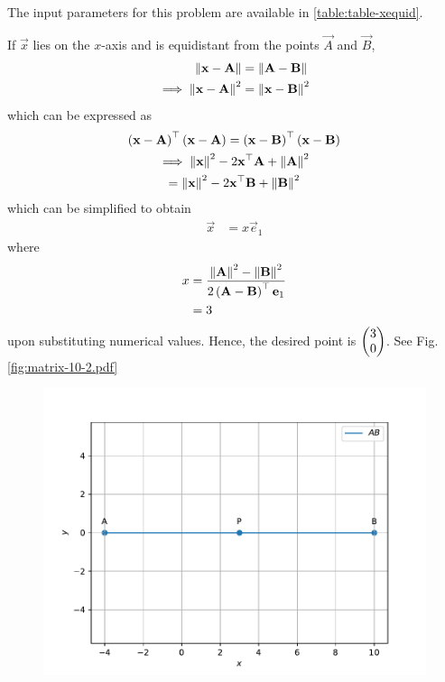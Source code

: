 \documentclass[journal,12pt,twocolumn]{IEEEtran}
\begin{document}
\begin{enumerate}
\solution The input parameters for this problem are available in 
\eqref{table:table-xequid}.	
\begin{table}[ht!]
	
\caption{}
\label{table:table-xequid}	
\end{table}
		If $\vec{x}$ lies on the  $x$-axis and is  equidistant from the points $\vec{A}$ and $\vec{B}$, 
\begin{align}
	\left\lVert\mathbf{x}-\mathbf{A}\right\rVert &=
\left\lVert\mathbf{A}-\mathbf{B}\right\rVert 
\\
	\implies \left\lVert\mathbf{x}-\mathbf{A}\right\rVert^2 &=
\left\lVert\mathbf{x}-\mathbf{B}\right\rVert^2 
\end{align}
which can be expressed as 
\begin{multline}
	\left(\mathbf{x}-\mathbf{A}\right)^{\top} \left(\mathbf{x}-\mathbf{A}\right)=
	\left(\mathbf{x}-\mathbf{B}\right)^{\top} 
\left(\mathbf{x}-\mathbf{B}\right)
\\
	\implies	\left\lVert\mathbf{x}\right\rVert^2-2{\mathbf{x}}^{\top}\mathbf{A} + \left\lVert\mathbf{A}\right\rVert^2
	\\= \left\lVert\mathbf{x}\right\rVert^2-2{\mathbf{x}}^{\top}\mathbf{B} + \left\lVert\mathbf{B}\right\rVert^2
\end{multline}
which can be simplified to obtain
  \begin{align}
	  \vec{x} &=
	   x\vec{e}_1
  \end{align}
  where 
  \begin{align}
	  x &=\frac{\left\lVert\mathbf{A}\right\rVert^2 -\left\lVert\mathbf{B}\right\rVert^2 }{2\left(\mathbf{A}-\mathbf{B}\right)^{\top }\mathbf{e}_1
}
\\
	  &= 3
	  \label{eq:cbse_10_x}
  \end{align}
upon   substituting numerical values. 
Hence, the desired point is $\begin{pmatrix} 3 \\ 0\end{pmatrix}$.
    See Fig. 
	  \ref{fig:matrix-10-2.pdf}
  \begin{figure}
	  \centering 
	  \includegraphics[width=\columnwidth]{figs/matrix-10-2.pdf}

\end{figure}
\end{enumerate}
\end{document}
